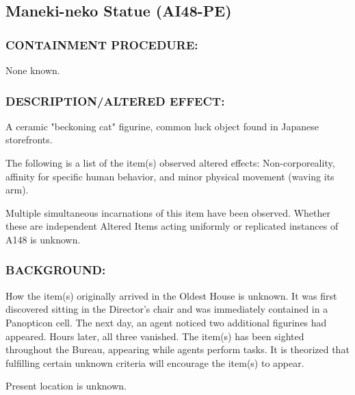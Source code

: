 \subsection*{Maneki-neko Statue (AI48-PE)}
\subsubsection*{CONTAINMENT PROCEDURE:}
\par None known.
\subsubsection*{DESCRIPTION/ALTERED EFFECT:}
\par A ceramic "beckoning cat" figurine,
common luck object found in Japanese
storefronts.
\par The following is a list of the item(s)
observed altered effects: Non-corporeality, affinity for specific
human behavior, and minor physical movement (waving its arm).
\par Multiple simultaneous incarnations of this item have been
observed. Whether these are independent Altered Items acting
uniformly or replicated instances of A148 is unknown.
\subsubsection*{BACKGROUND:}
\par How the item(s) originally arrived in the Oldest House is unknown.
It was first discovered sitting in the Director's chair and was
immediately contained in a Panopticon cell. The next day, an agent
noticed two additional figurines had appeared. Hours later, all
three vanished. The item(s) has been sighted throughout the
Bureau, appearing while agents perform 
tasks. It is
theorized that fulfilling certain unknown criteria will encourage the
item(s) to appear.
\par Present location is unknown.